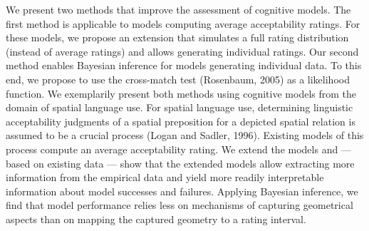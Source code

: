 We present two methods that improve the assessment of cognitive models. The first method is applicable to models computing average acceptability ratings. For these models, we propose an extension that simulates a full rating distribution (instead of average ratings) and allows generating individual ratings. Our second method enables Bayesian inference for models generating individual data. To this end, we propose to use the cross-match test (Rosenbaum, 2005) as a likelihood function. We exemplarily present both methods using cognitive models from the domain of spatial language use. For spatial language use, determining linguistic acceptability judgments of a spatial preposition for a depicted spatial relation is assumed to be a crucial process (Logan and Sadler, 1996). Existing models of this process compute an average acceptability rating. We extend the models and --- based on existing data --- show that the extended models allow extracting more information from the empirical data and yield more readily interpretable information about model successes and failures. Applying Bayesian inference, we find that model performance relies less on mechanisms of capturing geometrical aspects than on mapping the captured geometry to a rating interval.
